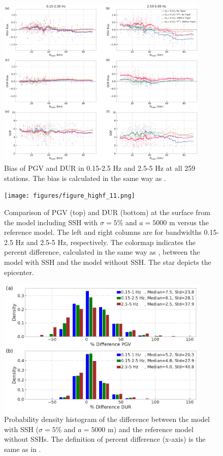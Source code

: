 \begin{figure}[!ht]
  \centering
  \includegraphics[width=0.9\textwidth,height=0.9\textheight,keepaspectratio]{figures/figure_highf_10.pdf}
  \caption{Bias of PGV and DUR in 0.15-2.5 Hz and 2.5-5 Hz at all 259 stations. The bias is calculated in the same way as .
  }
  \label{fig:highf-10}
\end{figure}
\clearpage

\begin{figure}[!ht]
  \centering
  \texttt{[image: figures/figure\_highf\_11.png]}
  \caption{Comparison of PGV (top) and DUR (bottom) at the surface from the model including SSH with $\sigma = 5\%$ and $a = 5000$ m versus the reference model. The left and right columns are for bandwidths 0.15-2.5 Hz and 2.5-5 Hz, respectively. The colormap indicates the percent difference, calculated in the same way as , between the model with SSH and the model without SSH. The star depicts the epicenter.
  }
  \label{fig:highf-11}
\end{figure}
\clearpage

\begin{figure}[!ht]
  \centering
  \includegraphics[width=0.9\textwidth,height=0.9\textheight,keepaspectratio]{figures/figure_highf_12.pdf}
  \caption{Probability density histogram of the difference between the model with SSH ($\sigma = 5\%$ and $a = 5000$ m) and the reference model without SSHs. The definition of percent difference (x-axis) is the same as in .
  }
  \label{fig:highf-12}
\end{figure}
\clearpage

